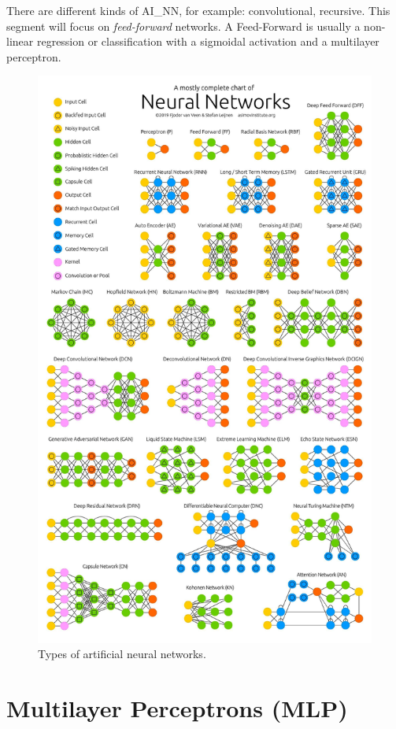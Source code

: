 There are different kinds of \gls{AI_NN}, for example: convolutional, recursive. This segment will focus on \textit{feed-forward} networks. A Feed-Forward is usually a non-linear regression or classification with a sigmoidal activation and a multilayer perceptron.

\begin{figure}[H]
	\centering
	\includegraphics[scale = 0.1]{attachment/chapter_AML/Scc035}
	\caption{Types of artificial neural networks.}
\end{figure}

\section{Multilayer Perceptrons (MLP)}

